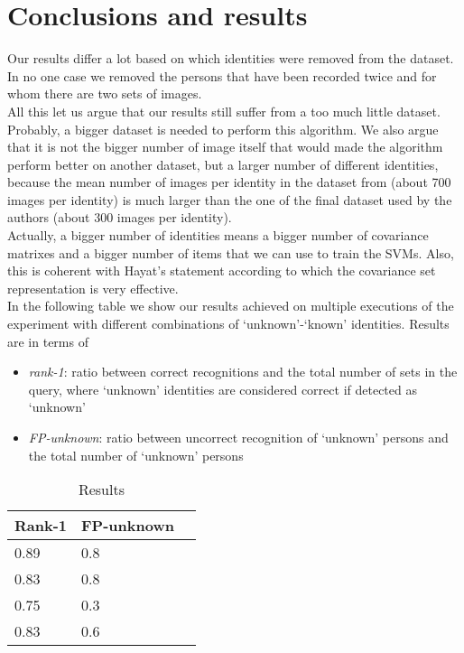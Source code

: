 \documentclass{article}
\begin{document}
\section{Conclusions and results}
Our results differ a lot based on which identities were removed from the dataset.
In no one case we removed the persons that have been recorded twice and for whom
there are two sets of images.
\\
All this let us argue that our results still suffer from a too much little
dataset. Probably, a bigger dataset is needed to perform this algorithm. We
also argue that it is not the bigger number of image itself that would made the
algorithm perform better on another dataset, but a larger number of different
identities, because the mean number of images per identity in the dataset from
\citep{Fanelli2013} (about 700 images per identity) is much larger than the
one of the final dataset used by the authors (about 300 images per identity).
\\
Actually, a bigger number of identities means a bigger number of covariance
matrixes and a bigger number of items that we can use to train the SVMs. Also,
this is coherent with Hayat's statement according to which the covariance set
representation is very effective.
\\
In the following table we show our results achieved on multiple executions of
the experiment with different combinations of `unknown'-`known' identities.
Results are in terms of
\begin{itemize}
	\item \textit{rank-1}: ratio between correct recognitions and the
		total number of sets in the query, where `unknown'
		identities are considered correct if detected as `unknown'
	\item \textit{FP-unknown}: ratio between uncorrect recognition of
		`unknown' persons and the total number of `unknown' persons
\end{itemize}
\begin{table}[]
	\centering
	\caption{Results}
	\label{tab:results}
	\begin{tabular}{|l|l|l|}
		\hline
		\bf Rank-1 & \bf FP-unknown \\ \hline
		0.89	   & 0.8 \\ \hline
		0.83	   & 0.8 \\ \hline
		0.75	   & 0.3 \\ \hline
		0.83	   & 0.6 \\ \hline
	\end{tabular}
\end{table}
\end{document}
